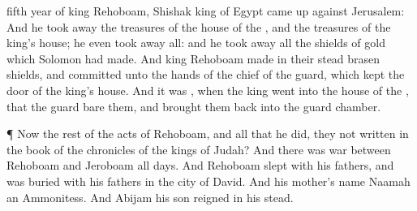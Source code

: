 {fifth
year of
king
Rehoboam,
{}
Shishak
king of
Egypt came
up against
Jerusalem:
And he took
away the
treasures of the
house of the
{}, and the
treasures of the
king’s
house; he even took
away all: and he took
away all the
shields of
gold which
Solomon had
made.
And
king
Rehoboam
made in their stead
brasen
shields, and
committed
{} unto the
hands of the
chief of the
guard, which
kept the
door of the
king’s
house.
And it was
{},
when the
king
went into the
house of the
{}, that the
guard
bare them, and brought them
back into the
guard
chamber.
\par }{\PP {}¶ Now the
rest of the
acts of
Rehoboam, and all that he
did,
{} they not
written in the
book of the
chronicles of the
kings of
Judah?
And there was
war between
Rehoboam and
Jeroboam all
{}
days.
And
Rehoboam
slept with his
fathers, and was
buried with his
fathers in the
city of
David. And his
mother’s
name
{}
Naamah an
Ammonitess. And
Abijam his
son
reigned in his stead.

}
